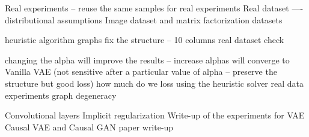 Real experiments -- reuse the same samples for real experiments
Real dataset —- distributional assumptions
Image dataset and matrix factorization datasets

heuristic algorithm
graphs fix the structure -- 10 columns
real dataset check

changing the alpha will improve the results -- increase alphas will converge to Vanilla VAE
(not sensitive after a particular value of alpha -- preserve the structure but good loss)
how much do we loss using the heuristic solver
real data experiments
graph degeneracy

Convolutional layers
Implicit regularization
Write-up of the experiments for VAE
Causal VAE and Causal GAN paper write-up
